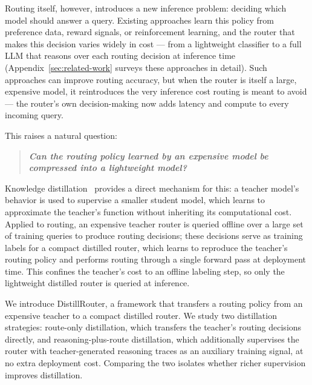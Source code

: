 \documentclass{article}
\begin{document}
Routing itself, however, introduces a new inference problem: deciding which model should answer a query. Existing approaches learn this policy from preference data, reward signals, or reinforcement learning, and the router that makes this decision varies widely in cost — from a lightweight classifier to a full LLM that reasons over each routing decision at inference time~\citep{ong2024routellm,zhang2025routerr1} (Appendix~\ref{sec:related-work} surveys these approaches in detail). Such approaches can improve routing accuracy, but when the router is itself a large, expensive model, it reintroduces the very inference cost routing is meant to avoid — the router's own decision-making now adds latency and compute to every incoming query.

This raises a natural question:
\begin{quote}
\textbf{\textit{Can the routing policy learned by an expensive model be compressed into a lightweight model?}}
\end{quote}


Knowledge distillation~\citep{hinton2015distilling} provides a direct mechanism for this: a teacher model's behavior is used to supervise a smaller student model, which learns to approximate the teacher's function without inheriting its computational cost. Applied to routing, an expensive teacher router is queried offline over a large set of training queries to produce routing decisions; these decisions serve as training labels for a compact distilled router, which learns to reproduce the teacher's routing policy and performs routing through a single forward pass at deployment time. This confines the teacher's cost to an offline labeling step, so only the lightweight distilled router is queried at inference. 

We introduce DistillRouter, a framework that transfers a routing policy from an expensive teacher to a compact distilled router. We study two distillation strategies: route-only distillation, which transfers the teacher's routing decisions directly, and reasoning-plus-route distillation, which additionally supervises the router with teacher-generated reasoning traces as an auxiliary training signal, at no extra deployment cost. Comparing the two isolates whether richer supervision improves distillation.
\end{document}

